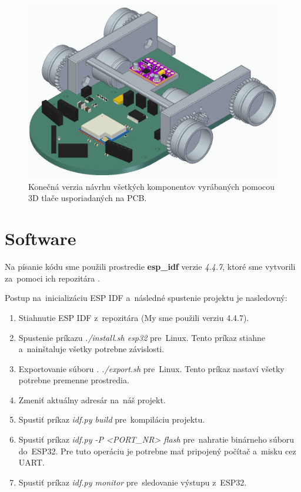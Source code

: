 \begin{figure}[!htpb]
    \centering
    \includegraphics[width=1\linewidth]{includes//images/main_board.jpg}
    \caption{Konečná verzia návrhu všetkých komponentov vyrábaných pomocou 3D tlače usporiadaných na PCB.}
    \label{fig:MainBoard}
\end{figure}

\section{Software}
\label{sec:software}

Na písanie kódu sme použili prostredie \textbf{esp\_idf} verzie \textit{4.4.7}, ktoré sme vytvorili za~pomoci
ich repozitára \cite{espGithub}.

Postup na~inicializáciu ESP IDF a~následné spustenie projektu je nasledovný:
\begin{enumerate}
	\item Stiahnutie ESP IDF z~repozitára \cite{espGithub} (My sme použili verziu 4.4.7).
	\item Spustenie príkazu \textit{./install.sh esp32} pre~Linux.
		Tento príkaz stiahne a~nainštaluje všetky potrebne závislosti.
	\item Exportovanie súboru \textit{. ./export.sh} pre~Linux.
		Tento príkaz nastaví všetky potrebne premenne prostredia.
	\item Zmeniť aktuálny adresár na~náš projekt.
	\item Spustiť príkaz \textit{idf.py build} pre~kompiláciu projektu.
	\item Spustiť príkaz \textit{idf.py -P <PORT\_NR> flash} pre~nahratie binárneho súboru do~ESP32.
		Pre tuto operáciu je potrebne mať pripojený počítač a~misku cez UART.
	\item Spustiť príkaz \textit{idf.py monitor} pre~sledovanie výstupu z~ESP32.
\end{enumerate}

